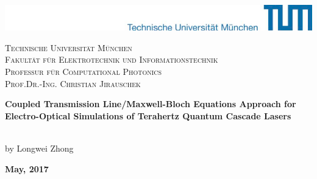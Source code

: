 %

\begin{titlepage}
\begin{center}
    \includegraphics[width=\textwidth]{images/Logos2.pdf}%
    
    \vspace{25mm}	
    
    {
        \scshape	
        Technische Universität München\\
        Fakultät für Elektrotechnik und Informationstechnik\\																										%
        Professur für Computational Photonics\\
        Prof.Dr.-Ing. Christian Jirauschek
    }
		
    \vspace{25mm}																								

    \begin{LARGE}
        \normalfont\rmfamily \textbf{Coupled Transmission Line/Maxwell-Bloch Equations Approach for Electro-Optical Simulations of Terahertz Quantum Cascade Lasers}\\[6cm]
    \end{LARGE}
   \\[0.5cm]
    
    by Longwei Zhong

    \textbf{May, 2017}\\[2cm]
																	
 																	
\end{center}

\end{titlepage}

\clearpage \thispagestyle{empty} \cleardoublepage 
